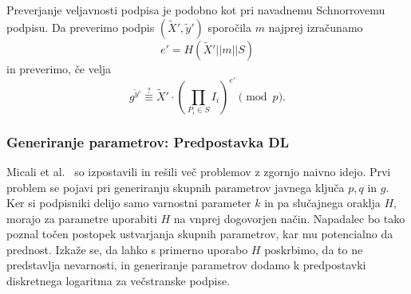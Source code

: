 \documentclass[isrm2, tisk]{fmfdelo}
\begin{document}
Preverjanje veljavnosti podpisa je podobno kot pri navadnemu Schnorrovemu podpisu. Da preverimo 
podpis $(\tilde{X}', \tilde{y}')$ sporočila $m$ najprej izračunamo 
$$ 
e' = H(\tilde{X}' || m || S)
$$ 
in preverimo, če velja 
$$
g^{\tilde{y}'} \stackrel{?}{\equiv} \tilde{X}' \cdot \left(\prod_{P_i \in S} I_i \right)^{e'} \pmod p.
$$

\subsubsection{Generiranje parametrov: Predpostavka DL}
Micali et al.~\cite{micali2001asm} so izpostavili in rešili več problemov z zgornjo naivno idejo. 
Prvi problem se pojavi pri generiranju skupnih parametrov javnega ključa $p, q$ in $g$. Ker si podpisniki 
delijo samo varnostni parameter $k$ in pa slučajnega oraklja $H$, morajo za parametre uporabiti 
$H$ na vnprej dogovorjen način. Napadalec bo tako poznal točen postopek ustvarjanja skupnih 
parametrov, kar mu potencialno da prednost. Izkaže se, da lahko s primerno uporabo $H$ poskrbimo, 
da to ne predstavlja nevarnosti, in generiranje parametrov dodamo k predpostavki diskretnega 
logaritma za večstranske podpise. 
\end{document}

